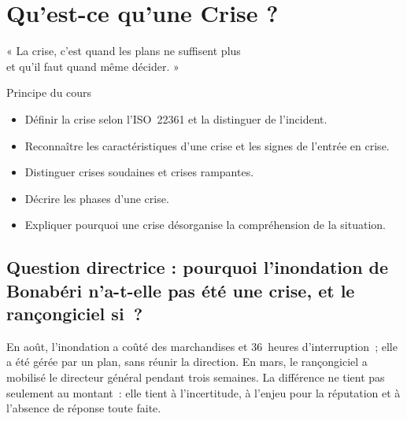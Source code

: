 
\chapter{Qu'est-ce qu'une Crise ?}
\label{chap:crise}

\epigraph{%
    « La crise, c'est quand les plans ne suffisent plus\\
    et qu'il faut quand même décider. »%
}{Principe du cours}


\begin{boxobjectifs}
\begin{itemize}
    \item Définir la crise selon l'ISO~22361 et la distinguer de l'incident.
    \item Reconnaître les caractéristiques d'une crise et les signes de
          l'entrée en crise.
    \item Distinguer crises soudaines et crises rampantes.
    \item Décrire les phases d'une crise.
    \item Expliquer pourquoi une crise désorganise la compréhension de la
          situation.
\end{itemize}
\end{boxobjectifs}

\bigskip

\section*{Question directrice : pourquoi l'inondation de Bonabéri n'a-t-elle pas été une crise, et le rançongiciel si~?}

En août, l'inondation a coûté des marchandises et 36~heures
d'interruption~; elle a été gérée par un plan, sans réunir la direction.
En mars, le rançongiciel a mobilisé le directeur général pendant trois
semaines. La différence ne tient pas seulement au montant~: elle tient à
l'incertitude, à l'enjeu pour la réputation et à l'absence de réponse
toute faite.


